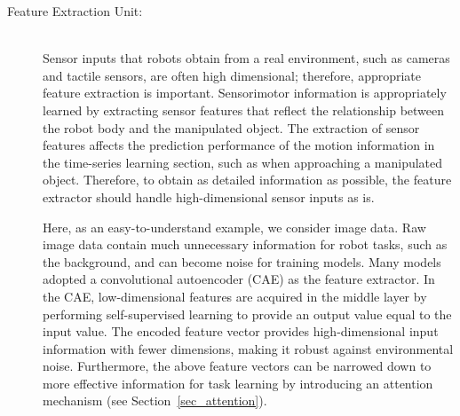 \begin{description}
\item[Feature Extraction Unit:]\mbox{}\\
Sensor inputs that robots obtain from a real environment, such as cameras and tactile sensors, are often high dimensional; therefore, appropriate feature extraction is important. Sensorimotor information is appropriately learned by extracting sensor features that reflect the relationship between the robot body and the manipulated object. The extraction of sensor features affects the prediction performance of the motion information in the time-series learning section, such as when approaching a manipulated object. Therefore, to obtain as detailed information as possible, the feature extractor should handle high-dimensional sensor inputs as is.


Here, as an easy-to-understand example, we consider image data. Raw image data contain much unnecessary information for robot tasks, such as the background, and can become noise for training models. Many models adopted a convolutional autoencoder (CAE) as the feature extractor. In the CAE, low-dimensional features are acquired in the middle layer by performing self-supervised learning to provide an output value equal to the input value. The encoded feature vector provides high-dimensional input information with fewer dimensions, making it robust against environmental noise. Furthermore, the above feature vectors can be narrowed down to more effective information for task learning by introducing an attention mechanism (see Section~\ref{sec_attention}).



\end{description}
